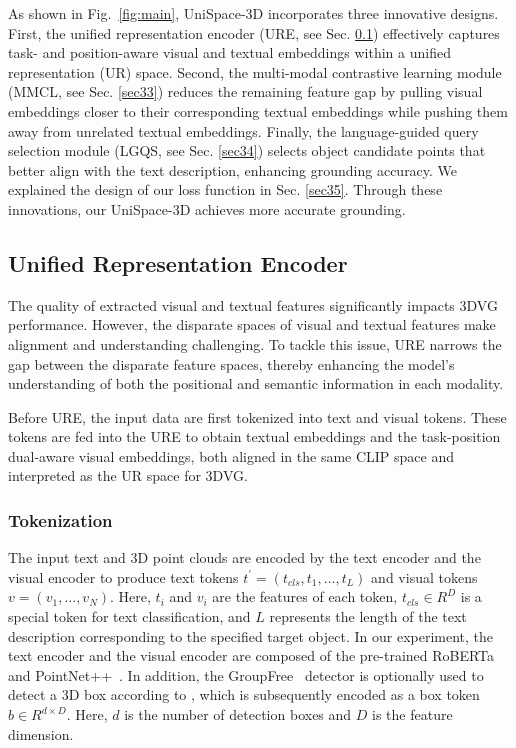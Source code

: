 \documentclass[lettersize,journal]{IEEEtran}
\begin{document}
As shown in Fig.~\textcolor{red}{\ref{fig:main}}, UniSpace-3D incorporates three innovative designs. 
First, the unified representation encoder (URE, see Sec. \textcolor{red}{\ref{sec32}})  effectively captures task- and position-aware visual and textual embeddings within a unified representation (UR) space.
Second, the multi-modal contrastive learning module (MMCL, see Sec. \textcolor{red}{\ref{sec33}}) reduces the remaining feature gap by pulling visual embeddings closer to their corresponding textual embeddings while pushing them away from unrelated textual embeddings.
Finally, the language-guided query selection module (LGQS, see Sec. \textcolor{red}{\ref{sec34}}) selects object candidate points that better align with the text description, enhancing grounding accuracy. We explained the design of our loss function in Sec. \textcolor{red}{\ref{sec35}}. 
Through these innovations, our UniSpace-3D achieves more accurate grounding.


\subsection{Unified Representation Encoder}
\label{sec32}

The quality of extracted visual and textual features significantly impacts 3DVG performance.
However, the disparate spaces of visual and textual features make alignment and understanding challenging. 
To tackle this issue, URE narrows the gap between the disparate feature spaces, thereby enhancing the model's understanding of both the positional and semantic information in each modality. 

Before URE, the input data are first tokenized into text and visual tokens. 
These tokens are fed into the URE to obtain textual embeddings and the task-position dual-aware visual embeddings, both aligned in the same CLIP \cite{clip} space and interpreted as the UR space for 3DVG.

\subsubsection{Tokenization}
The input text and 3D point clouds are encoded by the text encoder and the visual encoder to produce text tokens $t^{\prime}=(t_{cls},t_1,...,t_L)$ and visual tokens $v =(v_1,...,v_N)$. Here, $t_i$ and $v_i$ are the features of each token,  $t_{cls} \in R^D$ is a special token for text classification, and $L$ represents the length of the text description corresponding to the specified target object. In our experiment, the text encoder and the visual encoder are composed of the pre-trained RoBERTa~\cite{roberta} and PointNet++~\cite{pointnet}. In addition, the GroupFree~\cite{groupfree} detector is optionally used to detect a 3D box according to  \cite{eda}, which is subsequently encoded as a box token $b\in R ^{d\times D}$. Here, $d$ is the number of detection boxes and $D$ is the feature dimension.
\end{document}
